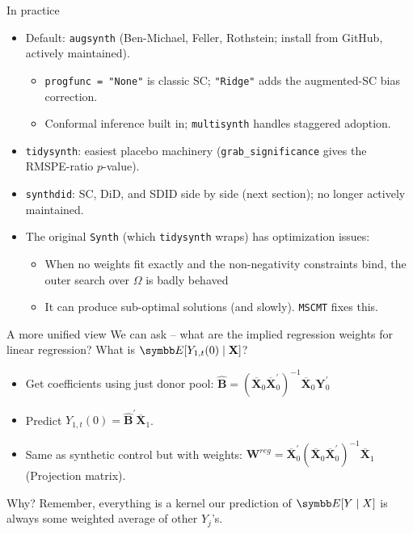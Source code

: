 \documentclass[aspectratio=169,11pt]{beamer}
\begin{document}
\begin{frame}{In practice}
\begin{itemize}
\item \alert{Default:} \texttt{augsynth} (Ben-Michael, Feller, Rothstein; install from GitHub, actively maintained).
\begin{itemize}
\item \texttt{progfunc = "None"} is classic SC; \texttt{"Ridge"} adds the augmented-SC bias correction.
\item Conformal inference built in; \texttt{multisynth} handles staggered adoption.
\end{itemize}
\item \texttt{tidysynth}: easiest placebo machinery (\texttt{grab\_significance} gives the RMSPE-ratio $p$-value).
\item \texttt{synthdid}: SC, DiD, and SDID side by side (next section); no longer actively maintained.
\item The original \texttt{Synth} (which \texttt{tidysynth} wraps) has optimization issues:
\begin{itemize}
\item When no weights fit exactly and the non-negativity constraints bind, the outer search over $\Omega$ is badly behaved
\item It can produce sub-optimal solutions (and slowly). \texttt{MSCMT} fixes this.
\end{itemize}

\end{itemize}

\end{frame}


\begin{frame}{A more unified view}
We can ask -- what are the implied regression weights for linear regression? What is $\E[Y_{1,t}(0) \mid \mathbf{X}]$?
\begin{itemize}
\item Get coefficients using just donor pool: $\widehat{\boldsymbol{B}}=\left(\overline{\boldsymbol{X}}_{0} \overline{\boldsymbol{X}}_{0}^{\prime}\right)^{-1} \overline{\boldsymbol{X}}_{0} \boldsymbol{Y}_{0}^{\prime}$
\item Predict $Y_{1,t}(0) = \widehat{\boldsymbol{B}}^{\prime} \overline{\boldsymbol{X}}_{1}$.
\item Same as synthetic control but with weights: $\boldsymbol{W}^{r e g}=\overline{\boldsymbol{X}}_{0}^{\prime}\left(\overline{\boldsymbol{X}}_{0} \overline{\boldsymbol{X}}_{0}^{\prime}\right)^{-1} \overline{\boldsymbol{X}}_{1}$ (Projection matrix).
\end{itemize}
Why? Remember, \alert{everything is a kernel} our prediction of $\E[Y \mid X]$ is always some weighted average of other $Y_j$'s.
\end{frame}
\end{document}
